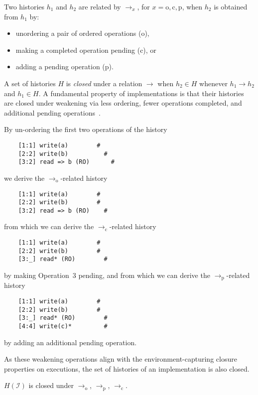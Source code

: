 Two histories $h_1$ and $h_2$ are related by $\to_x$, for $x = \mathrm{o},
\mathrm{c}, \mathrm{p}$, when $h_2$ is obtained from $h_1$ by:
\begin{itemize}

  \item unordering a pair of ordered operations (o),

  \item making a completed operation pending (c), or

  \item adding a pending operation (p).

\end{itemize}
A set of histories $H$ is \emph{closed} under a relation $\to$ when $h_2 \in H$
whenever $h_1 \to h_2$ and $h_1 \in H$. A fundamental property of
implementations is that their histories are closed under weakening via less
ordering, fewer operations completed, and additional pending
operations~\cite{conf/popl/BouajjaniEEH15}.

\begin{example}

  By un-ordering the first two operations of the history
\begin{verbatim}
    [1:1] write(a)        #
    [2:2] write(b)          #
    [3:2] read => b (RO)      #
\end{verbatim}
  we derive the $\to_\mathrm{o}$-related history
\begin{verbatim}
    [1:1] write(a)        #
    [2:2] write(b)        #
    [3:2] read => b (RO)    #
\end{verbatim}
  from which we can derive the $\to_\mathrm{c}$-related history
\begin{verbatim}
    [1:1] write(a)        #
    [2:2] write(b)        #
    [3:_] read* (RO)        #
\end{verbatim}
  by making Operation~$3$ pending, and from which we can derive the
  $\to_\mathrm{p}$-related history
\begin{verbatim}
    [1:1] write(a)        #
    [2:2] write(b)        #
    [3:_] read* (RO)        #
    [4:4] write(c)*         #
\end{verbatim}
  by adding an additional pending operation.

\end{example}

As these weakening operations align with the environment-capturing closure
properties on executions, the set of histories of an implementation is also
closed.

\begin{lemma}

  $H(\mathcal{I})$ is closed under $\to_\mathrm{o}$, $\to_\mathrm{p}$,
  $\to_\mathrm{c}$.

\end{lemma}
